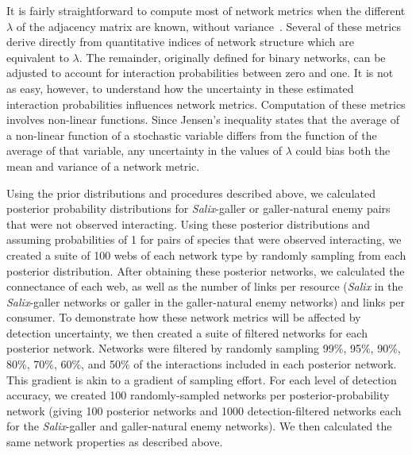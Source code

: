 \documentclass[12pt]{article}
\begin{document}
\begin{spacing}{2.0}

    It is fairly straightforward to compute most of network metrics when the different $\lambda$ of the adjacency matrix are known, without variance~\citep{Poisot2016}. Several of these metrics derive directly from quantitative indices of network structure which are equivalent to $\lambda$. The remainder, originally defined for binary networks, can be adjusted to account for interaction probabilities between zero and one. It is not as easy, however, to understand how the uncertainty in these estimated interaction probabilities influences network metrics. Computation of these metrics involves non-linear functions. Since Jensen's inequality states that the average of a non-linear function of a stochastic variable differs from the function of the average of that variable, any uncertainty in the values of $\lambda$ could bias both the mean and variance of a network metric.

    Using the prior distributions and procedures described above, we calculated posterior probability distributions for \emph{Salix}-galler or galler-natural enemy pairs that were not observed interacting. Using these posterior distributions and assuming probabilities of 1 for pairs of species that were observed interacting, we created a suite of 100 webs of each network type by randomly sampling from each posterior distribution. After obtaining these posterior networks, we calculated the connectance of each web, as well as the number of links per resource (\emph{Salix} in the \emph{Salix}-galler networks or galler in the galler-natural enemy networks) and links per consumer. To demonstrate how these network metrics will be affected by detection uncertainty, we then created a suite of filtered networks for each posterior network. Networks were filtered by randomly sampling 99\%, 95\%, 90\%, 80\%, 70\%, 60\%, and 50\% of the interactions included in each posterior network. This gradient is akin to a gradient of sampling effort. For each level of detection accuracy, we created 100 randomly-sampled networks per posterior-probability network (giving 100 posterior networks and 1000 detection-filtered networks each for the \emph{Salix}-galler and galler-natural enemy networks). We then calculated the same network properties as described above.



\end{spacing}
\end{document}
